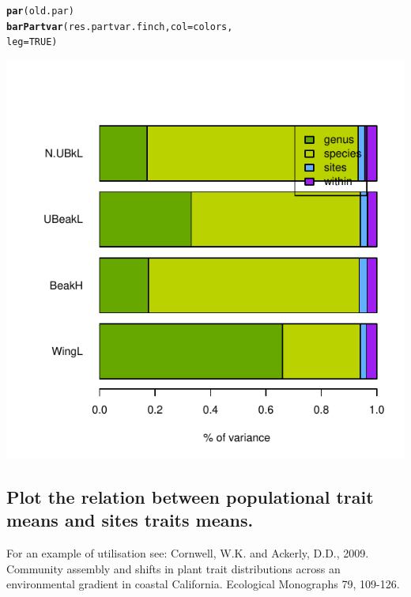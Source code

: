 \documentclass[12pt]{article}\usepackage[]{graphicx}\usepackage[]{color}
\makeatletter
\def\maxwidth{ %
  \ifdim\Gin@nat@width>\linewidth
    \linewidth
  \else
    \Gin@nat@width
  \fi
}
\newcommand{\hlnum}[1]{\textcolor[rgb]{0.686,0.059,0.569}{#1}}%
\newcommand{\hlstd}[1]{\textcolor[rgb]{0.345,0.345,0.345}{#1}}%
\newcommand{\hlkwc}[1]{\textcolor[rgb]{0.333,0.667,0.333}{#1}}%
\newcommand{\hlkwd}[1]{\textcolor[rgb]{0.737,0.353,0.396}{\textbf{#1}}}%
\newenvironment{kframe}{%
 \def\at@end@of@kframe{}%
 \ifinner\ifhmode%
  \def\at@end@of@kframe{\end{minipage}}%
  \begin{minipage}{\columnwidth}%
 \fi\fi%
 \def\FrameCommand##1{\hskip\@totalleftmargin \hskip-\fboxsep
 \colorbox{shadecolor}{##1}\hskip-\fboxsep
     \hskip-\linewidth \hskip-\@totalleftmargin \hskip\columnwidth}%
 \MakeFramed {\advance\hsize-\width
   \@totalleftmargin\z@ \linewidth\hsize
   \@setminipage}}%
 {\par\unskip\endMakeFramed%
 \at@end@of@kframe}
\newenvironment{knitrout}{}{} %
\makeatother
\begin{document}
\begin{knitrout}
{}


\begin{kframe}\begin{alltt}
\hlkwd{par}\hlstd{(old.par)}
\hlkwd{barPartvar}\hlstd{(res.partvar.finch,} \hlkwc{col}\hlstd{=colors,}
            \hlkwc{leg}\hlstd{=}\hlnum{TRUE}\hlstd{)}
\end{alltt}
\end{kframe}

{\centering \includegraphics[width=\maxwidth]{figure/unnamed-chunk-242} 

}



\end{knitrout}



\newpage

\subsection{Plot the relation between populational trait means and sites traits means.}

For an example of utilisation see: Cornwell, W.K. and Ackerly, D.D., 2009. Community assembly and shifts in plant trait distributions across an environmental gradient in coastal California. Ecological Monographs 79, 109-126.
\end{document}

